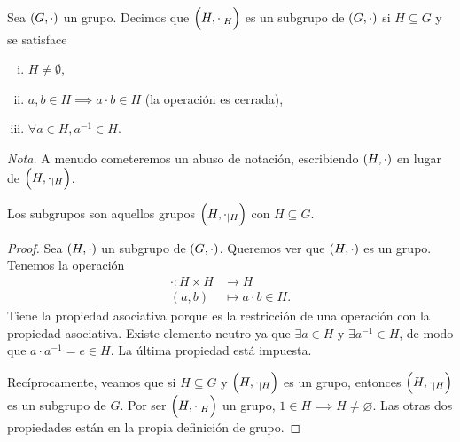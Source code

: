 \begin{defi}[subgrupo] \label{defi:subgrupo}
    Sea $\left( G, \cdot \right)$ un grupo. Decimos que $\left( H, \cdot_{\mid H} \right)$ es un subgrupo de $\left( G, \cdot \right)$ si $H \subseteq G$ y se satisface
    \begin{enumerate}[i)]
        \item $H \neq \emptyset$,
        \item $a, b \in H \implies a\cdot b \in H$ (la operación es cerrada),
        \item $\forall a \in H, a^{-1} \in H$.
    \end{enumerate}
    \emph{Nota. } A menudo cometeremos un abuso de notación, escribiendo $\left( H, \cdot \right)$ en lugar de $\left( H, \cdot_{\mid H} \right)$.
\end{defi}

\begin{prop}
    Los subgrupos son aquellos grupos $\left( H, \cdot_{\mid H} \right)$ con $H\subseteq G$.
\end{prop}
\begin{proof}
    Sea $\left( H, \cdot \right)$ un subgrupo de $\left( G, \cdot \right)$. Queremos ver que $\left( H, \cdot \right)$ es un grupo.
    Tenemos la operación
    \[
        \begin{aligned}
            \cdot \colon H \times H &\to H \\
            (a, b) &\mapsto a\cdot b \in H.
        \end{aligned}
    \]
    Tiene la propiedad asociativa porque es la restricción de una operación con la propiedad asociativa.
    Existe elemento neutro ya que $\exists a \in H$ y $\exists a^{-1} \in H$, de modo que $a\cdot a^{-1}=e \in H$.
    La última propiedad está impuesta.
    
    Recíprocamente, veamos que si $H\subseteq G$ y $\left( H, \cdot_{\mid H} \right)$ es un grupo, entonces $\left( H, \cdot_{\mid H} \right)$ es un subgrupo de $G$. Por ser $\left( H, \cdot_{\mid H} \right)$ un grupo, $1\in H \implies H\neq\varnothing$. Las otras dos propiedades están en la propia definición de grupo.
\end{proof}

